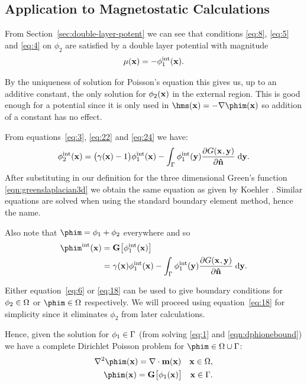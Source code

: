 \subsection{Application to Magnetostatic Calculations}
From Section~\ref{sec:double-layer-potent} we can see that conditions \eqref{eq:8}, \eqref{eq:5} and \eqref{eq:4} on $\phi_2$ are satisfied by a double layer potential with magnitude
\begin{equation}
  \label{eq:24}
  \mu(\mathbf{x}) = - \phi^{\text{int}}_1(\mathbf{x}).
\end{equation}

By the uniqueness of solution for Poisson's equation this gives us, up to an additive constant, the only solution for $\phi_2(\mathbf{x})$ in the external region.
This is good enough for a potential since it is only used in $\hms(\xv) = - \nabla \phim(\xv)$ so addition of a constant has no effect.

From equations~\eqref{eq:3}, \eqref{eq:22} and \eqref{eq:24} we have:
\begin{equation}
  \label{eq:6}
  \phi^{\text{int}}_2(\mathbf{x}) =  \big(\gamma(\mathbf{x}) - 1 \big) \phi^{\text{int}}_1(\mathbf{x})
  - \int_{{\Gamma}} \phi^{\text{int}}_1(\mathbf{y}) \frac{\partial G(\mathbf{x}_{},\mathbf{y})}{\partial \mathbf{\hat{n}}} {\; \text{d}} \mathbf{y}.
\end{equation}
After substituting in our definition for the three dimensional Green's function \eqref{eqn:greenslaplacian3d} we obtain the same equation as given by Koehler \cite{Koehler1997}.
Similar equations are solved when using the standard boundary element method, hence the name.

Also note that $\phim = \phi_1 + \phi_2$ everywhere and so
\begin{align}
  \label{eq:18}
  \phim^\inte(\xv) &= \bm \big[ \phi^\inte_1(\xv) \big] \\
  &= \gamma(\xv) \phi^\inte_1(\xv)
  - \int_{\boundd} \phi^\inte_1(\yv) \pd{\Green}{\nv} \d \yv. \notag
\end{align}

Either equation~\eqref{eq:6} or \eqref{eq:18} can be used to give boundary conditions for $\phi_2 \in \Omega$ or $\phim \in \magd$ respectively. We will proceed using equation~\eqref{eq:18} for simplicity since it eliminates $\phi_2$ from later calculations.

 Hence, given the solution for $\phi_1 \in {\Gamma}$ (from solving \eqref{eq:1} and \eqref{eqn:dphionebound}) we have a complete Dirichlet Poisson problem for $\phim \in \magd \cup \boundd$:
\begin{align}
  \label{eq:phim-bem}
  \lap \phim(\xv) = \nabla \cdot \mv(\xv) \quad \xv \in \magd, \\
  \phim(\xv) = \bm \big[ \phi_1(\xv) \big] \quad \xv \in \boundd.
\end{align}

